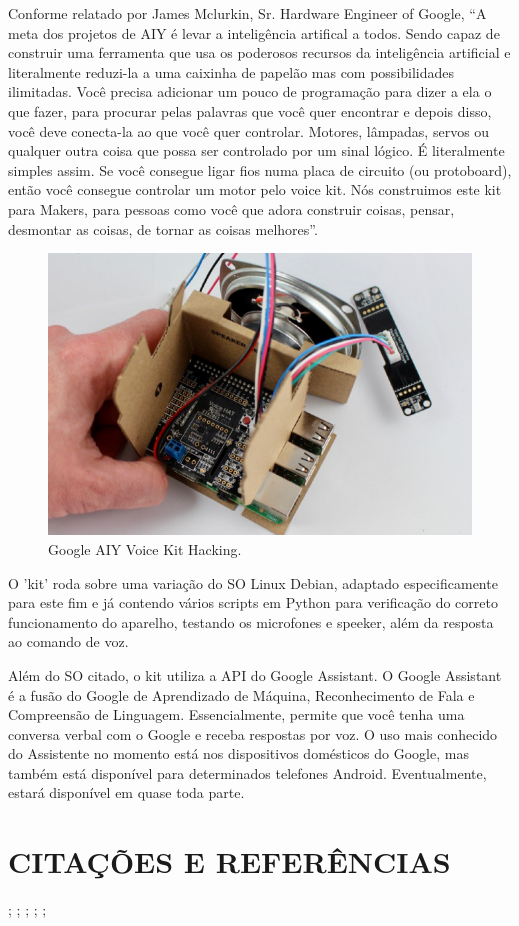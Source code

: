 \documentclass[10pt,brazil,english]{article}
\begin{document}
Conforme relatado por James Mclurkin, Sr. Hardware Engineer of Google, “A meta dos projetos de AIY é levar a inteligência artifical a todos. Sendo capaz de construir uma ferramenta que usa os poderosos recursos da inteligência artificial e literalmente reduzi-la a uma caixinha de papelão mas com possibilidades ilimitadas. Você precisa adicionar um pouco de programação para dizer a ela o que fazer, para procurar pelas palavras que você quer encontrar e depois disso, você deve conecta-la ao que você quer controlar. Motores, lâmpadas, servos ou qualquer outra coisa que possa ser controlado por um sinal lógico. É literalmente simples assim. Se você consegue ligar fios numa placa de circuito (ou protoboard), então você consegue controlar um motor pelo voice kit. Nós construimos este kit para Makers, para pessoas como você que adora construir coisas, pensar, desmontar as coisas, de tornar as coisas melhores”. 

\begin{figure}[!hbtp]
\begin{center}
\includegraphics[scale=.3]{voice_kit.jpeg}
\end{center}
\caption{Google AIY Voice Kit Hacking.}
\label{Fig1}
\end{figure}

O 'kit' roda sobre uma variação do SO Linux Debian, adaptado especificamente para este fim e já contendo vários scripts em Python para verificação do correto funcionamento do aparelho, testando os microfones e speeker, além da resposta ao comando de voz.

Além do SO citado, o kit utiliza a API do Google Assistant. O Google Assistant é a fusão do Google de Aprendizado de Máquina, Reconhecimento de Fala e Compreensão de Linguagem. Essencialmente, permite que você tenha uma conversa verbal com o Google e receba respostas por voz. O uso mais conhecido do Assistente no momento está nos dispositivos domésticos do Google, mas também está disponível para determinados telefones Android. Eventualmente, estará disponível em quase toda parte.

\section{\uppercase{Citações e referências}}


\cite{Cunha2018};
\cite{Nazario2017};
\cite{Silva2017};
\cite{Costa2017};
\cite{Ribeiro2017};




\end{document}
